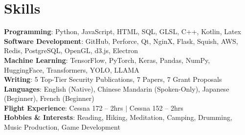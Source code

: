 \section{Skills}
 \begin{itemize}[leftmargin=0.5cm, label={}]
    \small{\item{
     \textbf{Programming}{: Python, JavaScript, HTML, SQL, GLSL, C++, Kotlin, Latex} \\
     \textbf{Software Development}{: GitHub, Perforce, Qt, NginX, Flask, Squish, AWS, Redis, PostgreSQL, OpenGL, d3.js, Electron} \\
     \textbf{Machine Learning}{: TensorFlow, PyTorch, Keras, Pandas, NumPy, HuggingFace, Transformers, YOLO, LLAMA} \\
     \textbf{Writing}{: 5 Top-Tier Security Publications, 7 Papers, 7 Grant Proposals} \\
     \textbf{Languages}{: English (Native), Chinese Mandarin (Spoken-Only), Japanese (Beginner), French (Beginner)} \\
     \textbf{Flight Experience}{: Cessna 172 -- 2hrs $|$ Cessna 152 -- 2hrs} \\
     \textbf{Hobbies \& Interests}{: Reading, Hiking, Meditation, Camping, Drumming, Music Production, Game Development} \\
    }}
 \end{itemize}